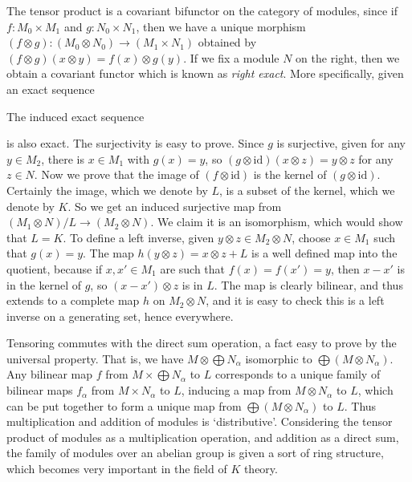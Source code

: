 The tensor product is a covariant bifunctor on the category of modules, since if $f: M_0 \times M_1$ and $g: N_0 \times N_1$, then we have a unique morphism $(f \otimes g): (M_0 \otimes N_0) \to (M_1 \times N_1)$ obtained by $(f \otimes g)(x \otimes y) = f(x) \otimes g(y)$. If we fix a module $N$ on the right, then we obtain a covariant functor which is known as \emph{right exact}. More specifically, given an exact sequence
%
\begin{center}
\end{center}
%
The induced exact sequence
%
\begin{center}
\end{center}
%
is also exact. The surjectivity is easy to prove. Since $g$ is surjective, given for any $y \in M_2$, there is $x \in M_1$ with $g(x) = y$, so $(g \otimes \text{id})(x \otimes z) = y \otimes z$ for any $z \in N$. Now we prove that the image of $(f \otimes \text{id})$ is the kernel of $(g \otimes \text{id})$. Certainly the image, which we denote by $L$, is a subset of the kernel, which we denote by $K$. So we get an induced surjective map from $(M_1 \otimes N)/L \to (M_2 \otimes N)$. We claim it is an isomorphism, which would show that $L = K$. To define a left inverse, given $y \otimes z \in M_2 \otimes N$, choose $x \in M_1$ such that $g(x) = y$. The map $h(y \otimes z) = x \otimes z + L$ is a well defined map into the quotient, because if $x,x' \in M_1$ are such that $f(x) = f(x') = y$, then $x - x'$ is in the kernel of $g$, so $(x - x') \otimes z$ is in $L$. The map is clearly bilinear, and thus extends to a complete map $h$ on $M_2 \otimes N$, and it is easy to check this is a left inverse on a generating set, hence everywhere.

Tensoring commutes with the direct sum operation, a fact easy to prove by the universal property. That is, we have $M \otimes \bigoplus N_\alpha$ isomorphic to $\bigoplus (M \otimes N_\alpha)$. Any bilinear map $f$ from $M \times \bigoplus N_\alpha$ to $L$ corresponds to a unique family of bilinear maps $f_\alpha$ from $M \times N_\alpha$ to $L$, inducing a map from $M \otimes N_\alpha$ to $L$, which can be put together to form a unique map from $\bigoplus (M \otimes N_\alpha)$ to $L$. Thus multiplication and addition of modules is `distributive'. Considering the tensor product of modules as a multiplication operation, and addition as a direct sum, the family of modules over an abelian group is given a sort of ring structure, which becomes very important in the field of $K$ theory.


